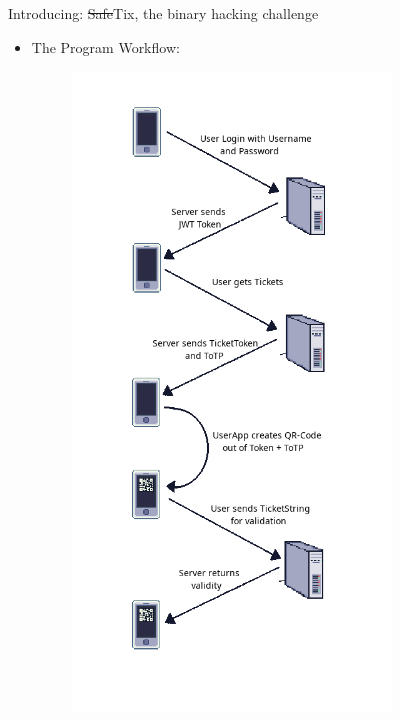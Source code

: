 \documentclass[final,dvipsnames]{beamer}
\newlength{\colwidth}
\begin{document}
\begin{frame}[t, fragile]
\begin{columns}[t]
\begin{column}{\colwidth}
\begin{block}{Introducing: \sout{Safe}Tix, the binary hacking challenge}
\begin{itemize}
            \textbf{Client:}
            \begin{itemize}
                \item Written in C++ with \textbf{Qt} for displaying QR codes in a Window.
                \item Tickets consist of a \textbf{token} and a \textbf{TOTP-generated OTP}.
                \item Connects to the server via HTTPS to fetch and validate tickets.
                \item Updates QR codes every 15 seconds.
            \end{itemize}
            \item The Program Workflow:
            \begin{figure}[h]
				\centering
				\includegraphics[width=0.8\textwidth]{figures/Workflow_v2.png}

\end{figure}
\end{itemize}
\end{block}
\end{column}
\end{columns}
\end{frame}
\end{document}
